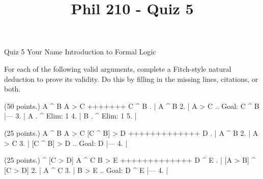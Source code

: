 
\title{Phil 210 - Quiz 5}

\heading
Quiz 5
Your Name
Introduction to Formal Logic
\endheading

For each of the following valid arguments, complete a Fitch-style natural deduction to prove its validity. Do this by filling in the missing lines, citations, or both.

\problems
{} (50 points.)
\argument
 A ^ B
 A > C
+++++++
 C ^ B
\endargument
        \answer
        . | A ^ B
         2. | A > C  ..  Goal: C ^ B
            |---
         3. | A      .  ^ Elim: 1
         4. | B      .  ^ Elim: 1
         5. | 
        \endfitchproof
        \endanswer

 (25 points.)
\argument
 A ^ B
 A > C
 [C ^ B] > D
+++++++++++++
 D
\endargument
        \answer
        . | A ^ B
         2. | A > C
         3. | [C ^ B] > D  ..  Goal: D
            |---
         4. | 
        \endfitchproof
        \endanswer

 (25 points.)
\argument
 [A > B] ^ [C > D]
 A ^ C
 B > E
+++++++++++++
 D ^ E
\endargument
        \answer
        . | [A > B] ^ [C > D]
         2. | A ^ C
         3. | B > E              ..  Goal: D ^ E
            |---
         4. |
        \endfitchproof
        \endanswer

\endproblems
\bye
